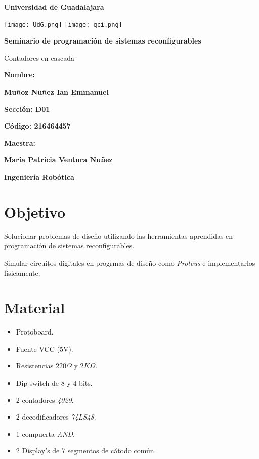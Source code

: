 \documentclass[12pt, oneside]{article}
\begin{document}
\begin{titlepage}
    \centering
    {\bfseries\LARGE Universidad de Guadalajara \par}
    \vfill
    {
        \texttt{[image: UdG.png]}
        \texttt{[image: qci.png]}
        \par
    }
    \vfill
    {\bfseries\LARGE Seminario de programación de sistemas reconfigurables \par}
    \vfill
    {\ttfamily\LARGE Contadores en cascada \par}
    \vfill
    {\bfseries\LARGE Nombre: \par}
    \vfill
    {\bfseries\LARGE  Muñoz Nuñez Ian Emmanuel \par}
    \vfill
    {\bfseries\LARGE Sección: D01 \par}
    \vfill
    {\bfseries\LARGE Código: 216464457 \par}
    \vfill
    {\bfseries\LARGE Maestra: \par}
    \vfill
    {\bfseries\LARGE María Patricia Ventura Nuñez \par}
    \vfill
    {\bfseries\LARGE Ingeniería Robótica \par}
\end{titlepage}


\newpage
\section{Objetivo}
{\sffamily\large
    \hspace{0.5cm} Solucionar problemas de diseño utilizando las herramientas aprendidas en
    programación de sistemas reconfigurables.

    \hspace{0.5cm} Simular circuitos digitales en progrmas de diseño como
    \emph{Proteus\textregistered} e implementarlos físicamente.

}

\section{Material}
{\sffamily\large
    \renewcommand{\labelitemi}{$\bullet$}
    \begin{itemize}
        \item Protoboard.
        \item Fuente VCC (5V).
        \item Resistencias $220\Omega$ y $2K\Omega$.
        \item Dip-switch de 8 y 4 bits.
        \item 2 contadores \emph{4029}.
        \item 2 decodificadores \emph{74LS48}.
        \item 1 compuerta \emph{AND}.
        \item 2 Display's de 7 segmentos de cátodo común.
    \end{itemize}

}
\end{document}
